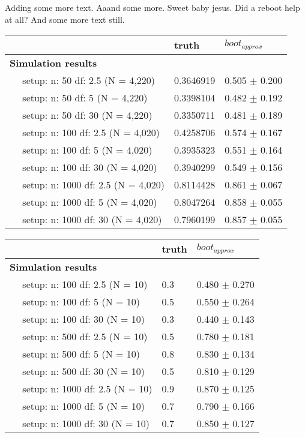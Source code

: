 \documentclass{article}
\begin{document}
Adding some more text. Aaand some more. Sweet baby jesus. Did a reboot help at all? And some more text still.

\begin{tabular}{l|l|l}
    \hline
    ~ & truth & $boot_{approx}$ \\
    \hline
    \bf{Simulation results} & ~ & ~\\
    \hline
    ~~ setup: n: 50 df: 2.5 (N = 4,220) & 0.3646919 & 0.505 $\pm$ 0.200\\
    \hline
    ~~ setup: n: 50 df: 5 (N = 4,220) & 0.3398104 & 0.482 $\pm$ 0.192\\
    \hline
    ~~ setup: n: 50 df: 30 (N = 4,220) & 0.3350711 & 0.481 $\pm$ 0.189\\
    \hline
    ~~ setup: n: 100 df: 2.5 (N = 4,020) & 0.4258706 & 0.574 $\pm$ 0.167\\
    \hline
    ~~ setup: n: 100 df: 5 (N = 4,020) & 0.3935323 & 0.551 $\pm$ 0.164\\
    \hline
    ~~ setup: n: 100 df: 30 (N = 4,020) & 0.3940299 & 0.549 $\pm$ 0.156\\
    \hline
    ~~ setup: n: 1000 df: 2.5 (N = 4,020) & 0.8114428 & 0.861 $\pm$ 0.067\\
    \hline
    ~~ setup: n: 1000 df: 5 (N = 4,020) & 0.8047264 & 0.858 $\pm$ 0.055\\
    \hline
    ~~ setup: n: 1000 df: 30 (N = 4,020) & 0.7960199 & 0.857 $\pm$ 0.055\\
    \hline
\end{tabular}


\begin{tabular}{l|l|l}
    \hline
     & truth & $boot_{approx}$\\
    \hline
    \bf{Simulation results} & ~ & ~\\
    \hline
    ~~ setup: n: 100 df: 2.5 (N = 10) & 0.3 & 0.480 $\pm$ 0.270\\
    \hline
    ~~ setup: n: 100 df: 5 (N = 10) & 0.5 & 0.550 $\pm$ 0.264\\
    \hline
    ~~ setup: n: 100 df: 30 (N = 10) & 0.3 & 0.440 $\pm$ 0.143\\
    \hline
    ~~ setup: n: 500 df: 2.5 (N = 10) & 0.5 & 0.780 $\pm$ 0.181\\
    \hline
    ~~ setup: n: 500 df: 5 (N = 10) & 0.8 & 0.830 $\pm$ 0.134\\
    \hline
    ~~ setup: n: 500 df: 30 (N = 10) & 0.5 & 0.810 $\pm$ 0.129\\
    \hline
    ~~ setup: n: 1000 df: 2.5 (N = 10) & 0.9 & 0.870 $\pm$ 0.125\\
    \hline
    ~~ setup: n: 1000 df: 5 (N = 10) & 0.7 & 0.790 $\pm$ 0.166\\
    \hline
    ~~ setup: n: 1000 df: 30 (N = 10) & 0.7 & 0.850 $\pm$ 0.127\\
    \hline
    \end{tabular}
\end{document}
